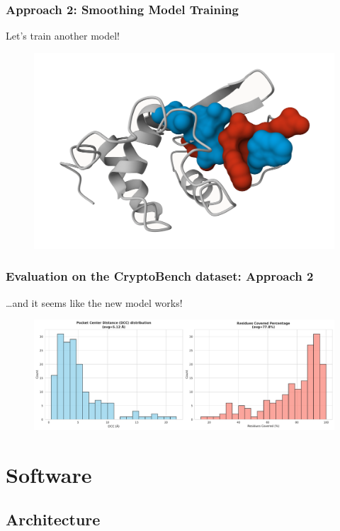 \documentclass[aspectratio=169]{beamer}
\begin{document}
\begin{frame}
  \frametitle{Approach 2: Smoothing Model Training}

  Let's train another model!

  \begin{figure}
    \centering
    \includegraphics[width=\linewidth,height=0.8\textheight,keepaspectratio]{fig/smoothing-difference.png}
  \end{figure}
\end{frame}

\begin{frame}
  \frametitle{Evaluation on the CryptoBench dataset: Approach 2}

  \dots and it seems like the new model works!

  \begin{figure}
    \includegraphics[width=\textwidth]{fig/smoothened-1.pdf}
  \end{figure}
\end{frame}

\section{Software}

\subsection{Architecture}
\end{document}
